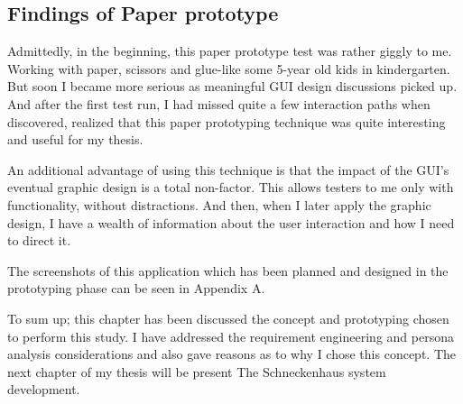 \subsection*{Findings of Paper prototype} \label{Findings of Paper prototype}

Admittedly, in the beginning, this paper prototype test was rather giggly to me. Working with paper, scissors and glue-like some 5-year old kids in kindergarten. But soon I became more serious as meaningful GUI design discussions picked up. And after the first test run, I had missed quite a few interaction paths when discovered, realized that this paper prototyping technique was quite interesting and useful for my thesis.

An additional advantage of using this technique is that the impact of the GUI's eventual graphic design is a total non-factor. This allows testers to me only with functionality, without distractions. And then, when I later apply the graphic design, I have a wealth of information about the user interaction and how I need to direct it.

The screenshots of this application which has been planned and designed in the prototyping phase can be seen in Appendix A.


To sum up; this chapter has been discussed the concept and prototyping chosen to perform this study. I have addressed the requirement engineering and persona analysis considerations and also gave reasons as to why I chose this concept. The next chapter of my thesis will be present The Schneckenhaus system development. 


